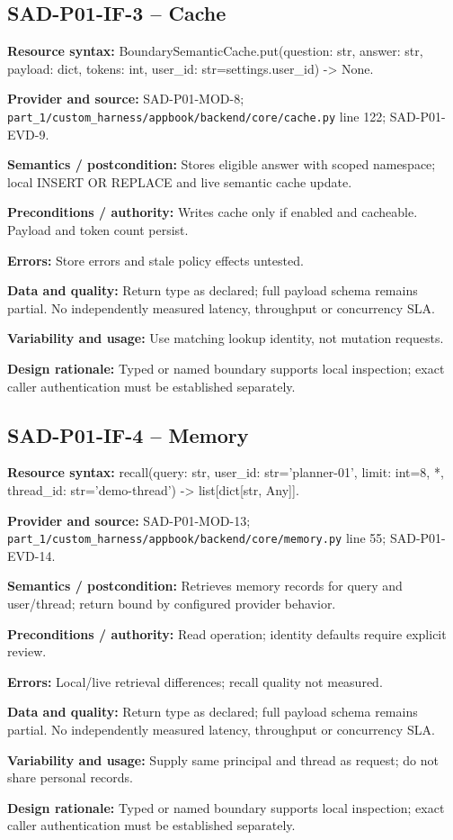 \documentclass[10pt,letterpaper]{article}
\begin{document}
\subsection{SAD-P01-IF-3 -- Cache}
{\raggedright \textbf{Resource syntax:} BoundarySemanticCache.put(\allowbreak{}question: str, answer: str, payload: dict, tokens: int, user\_\allowbreak{}id: str=settings.user\_\allowbreak{}id) -> None.\par}
\textbf{Provider and source:} SAD-P01-MOD-8; \nolinkurl{part_1/custom_harness/appbook/backend/core/cache.py} line 122; SAD-P01-EVD-9.\par
\textbf{Semantics / postcondition:} Stores eligible answer with scoped namespace; local INSERT OR REPLACE and live semantic cache update.\par
\textbf{Preconditions / authority:} Writes cache only if enabled and cacheable. Payload and token count persist.\par
\textbf{Errors:} Store errors and stale policy effects untested.\par
\textbf{Data and quality:} Return type as declared; full payload schema remains partial. No independently measured latency, throughput or concurrency SLA.\par
\textbf{Variability and usage:} Use matching lookup identity, not mutation requests.\par
\textbf{Design rationale:} Typed or named boundary supports local inspection; exact caller authentication must be established separately.\par

\subsection{SAD-P01-IF-4 -- Memory}
{\raggedright \textbf{Resource syntax:} recall(\allowbreak{}query: str, user\_\allowbreak{}id: str='planner-01', limit: int=8, *, thread\_\allowbreak{}id: str='demo-thread') -> list[dict[str, Any]].\par}
\textbf{Provider and source:} SAD-P01-MOD-13; \nolinkurl{part_1/custom_harness/appbook/backend/core/memory.py} line 55; SAD-P01-EVD-14.\par
\textbf{Semantics / postcondition:} Retrieves memory records for query and user/thread; return bound by configured provider behavior.\par
\textbf{Preconditions / authority:} Read operation; identity defaults require explicit review.\par
\textbf{Errors:} Local/live retrieval differences; recall quality not measured.\par
\textbf{Data and quality:} Return type as declared; full payload schema remains partial. No independently measured latency, throughput or concurrency SLA.\par
\textbf{Variability and usage:} Supply same principal and thread as request; do not share personal records.\par
\textbf{Design rationale:} Typed or named boundary supports local inspection; exact caller authentication must be established separately.\par
\end{document}

